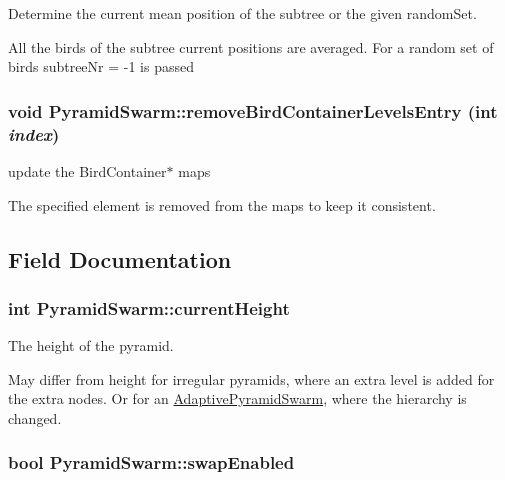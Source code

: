 Determine the current mean position of the subtree or the given randomSet. 

All the birds of the subtree current positions are averaged. For a random set of birds subtreeNr = -1 is passed \hypertarget{classPyramidSwarm_a33082c7cb70dd7bf2e33f97c4c69e01}{
\subsubsection{\setlength{\rightskip}{0pt plus 5cm}void PyramidSwarm::removeBirdContainerLevelsEntry (int {\em index})}}
\label{classPyramidSwarm_a33082c7cb70dd7bf2e33f97c4c69e01}


update the BirdContainer$\ast$ maps 

The specified element is removed from the maps to keep it consistent. 

\subsection{Field Documentation}
\hypertarget{classPyramidSwarm_99413b13720853105b55ee3c340f7e54}{
\subsubsection{\setlength{\rightskip}{0pt plus 5cm}int {\bf PyramidSwarm::currentHeight}}}
\label{classPyramidSwarm_99413b13720853105b55ee3c340f7e54}


The height of the pyramid. 

May differ from height for irregular pyramids, where an extra level is added for the extra nodes. Or for an \hyperlink{classAdaptivePyramidSwarm}{AdaptivePyramidSwarm}, where the hierarchy is changed. \hypertarget{classPyramidSwarm_e041e1a1e5cd917273c713186d8f3b99}{
\subsubsection{\setlength{\rightskip}{0pt plus 5cm}bool {\bf PyramidSwarm::swapEnabled}}}
\label{classPyramidSwarm_e041e1a1e5cd917273c713186d8f3b99}



